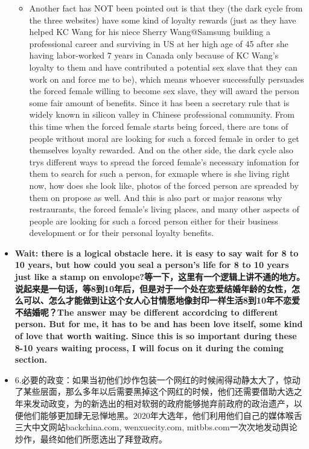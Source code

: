 \documentclass[9pt, b5paper]{article}
\begin{document}
\begin{itemize}
\begin{itemize}
\item Another fact has NOT been pointed out is that they (the dark cycle from the three websites) have some kind of loyalty rewards (just as they have helped KC Wang for his niece Sherry Wang@Samsung building a professional career and surviving in US at her high age of 45 after she having labor-worked 7 years in Canada only because of KC Wang's loyalty to them and have contributed a potential sex slave that they can work on and force me to be), which means whoever successfully persuades the forced female willing to become sex slave, they will award the person some fair amount of benefits. Since it has been a secretary rule that is widely known in silicon valley in Chinese professional community. From this time when the forced female starts being forced, there are tons of people without moral are looking for such a forced female in order to get themselves loyalty rewarded. And on the other side, the dark cycle also trys different ways to spread the forced female's necessary infomation for them to search for such a person, for exmaple where is she living right now, how does she look like, photos of the forced person are spreaded by them on propose as well. And this is also part or major reasons why restraurants, the forced female's living places, and many other aspects of people are looking for such a forced person either for their business development or for their personal loyalty benefits.
\end{itemize}
\item \textbf{Wait: there is a logical obstacle here. it is easy to say wait for 8 to 10 years, but how could you seal a person's life for 8 to 10 years just like a stamp on envolope?等一下，这里有一个逻辑上讲不通的地方。说起来是一句话，等8到10年后，但是对于一个处在恋爱结婚年龄的女性，怎么可以、怎么才能做到让这个女人心甘情愿地像封印一样生活8到10年不恋爱不结婚呢？The answer may be different accordcing to different person. But for me, it has to be and has been love itself, some kind of love that worth waiting. Since this is so important during these 8-10 years waiting process, I will focus on it during the coming section.}
\item 6.必要的政变：如果当初他们炒作包装一个网红的时候闹得动静太大了，惊动了某些层面，那么多年以后需要黑掉这个网红的时候，他们还需要借助大选之年来发动政变，为的新选出的相对软弱的政府能够抛弃前政府的政治遗产，以便他们能够更加肆无忌惮地黑。2020年大选年，他们利用他们自己的媒体喉舌三大中文网站backchina.com, wenxuecity.com, mitbbs.com一次次地发动舆论炒作，最终如他们所愿选出了拜登政府。

\end{itemize}
\end{document}

